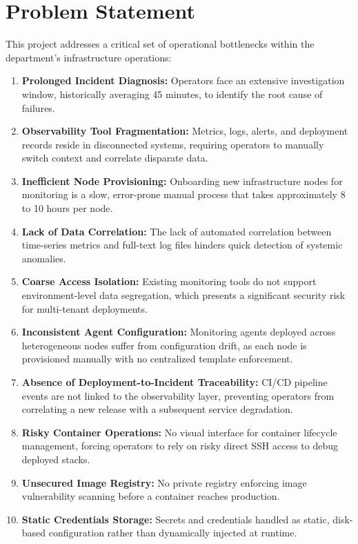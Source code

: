 \documentclass[12pt,a4paper]{report}
\begin{document}
\section*{Problem Statement}

This project addresses a critical set of operational bottlenecks within the department's infrastructure operations:

\begin{enumerate}
  \item \textbf{Prolonged Incident Diagnosis:} Operators face an extensive investigation window, historically averaging 45 minutes, to identify the root cause of failures.
  \item \textbf{Observability Tool Fragmentation:} Metrics, logs, alerts, and deployment records reside in disconnected systems, requiring operators to manually switch context and correlate disparate data.
  \item \textbf{Inefficient Node Provisioning:} Onboarding new infrastructure nodes for monitoring is a slow, error-prone manual process that takes approximately 8 to 10 hours per node.
  \item \textbf{Lack of Data Correlation:} The lack of automated correlation between time-series metrics and full-text log files hinders quick detection of systemic anomalies.
  \item \textbf{Coarse Access Isolation:} Existing monitoring tools do not support environment-level data segregation, which presents a significant security risk for multi-tenant deployments.
  \item \textbf{Inconsistent Agent Configuration:} Monitoring agents deployed across heterogeneous nodes suffer from configuration drift, as each node is provisioned manually with no centralized template enforcement.
  \item \textbf{Absence of Deployment-to-Incident Traceability:} CI/CD pipeline events are not linked to the observability layer, preventing operators from correlating a new release with a subsequent service degradation.
  \item \textbf{Risky Container Operations:} No visual interface for container lifecycle management, forcing operators to rely on risky direct SSH access to debug deployed stacks.
  \item \textbf{Unsecured Image Registry:} No private registry enforcing image vulnerability scanning before a container reaches production.
  \item \textbf{Static Credentials Storage:} Secrets and credentials handled as static, disk-based configuration rather than dynamically injected at runtime.
\end{enumerate}
\end{document}

